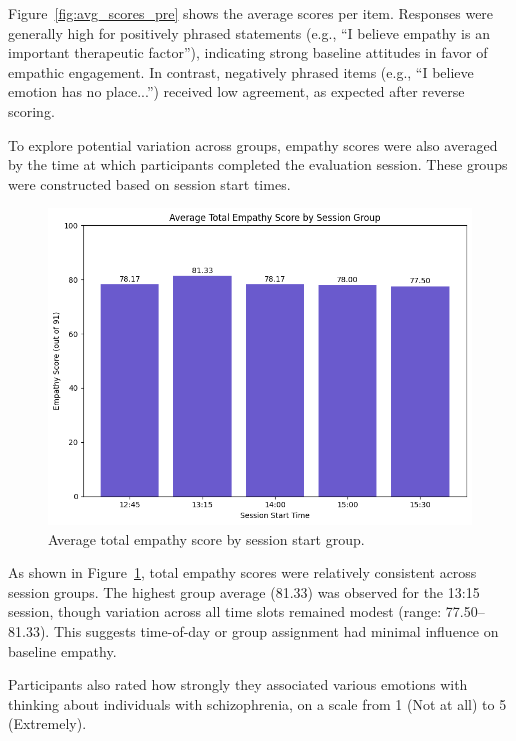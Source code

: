 Figure~\ref{fig:avg_scores_pre} shows the average scores per item. Responses were generally high for positively phrased statements (e.g., “I believe empathy is an important therapeutic factor”), indicating strong baseline attitudes in favor of empathic engagement. In contrast, negatively phrased items (e.g., “I believe emotion has no place...”) received low agreement, as expected after reverse scoring.

To explore potential variation across groups, empathy scores were also averaged by the time at which participants completed the evaluation session. These groups were constructed based on session start times.

\begin{figure}[H]
    \centering
    \includegraphics[width=0.75\columnwidth]{../../Figures/avg score-by-group-pre.png}
    \caption{Average total empathy score by session start group.}
    \label{fig:group_scores_pre}
\end{figure}

As shown in Figure~\ref{fig:group_scores_pre}, total empathy scores were relatively consistent across session groups. The highest group average (81.33) was observed for the 13:15 session, though variation across all time slots remained modest (range: 77.50–81.33). This suggests time-of-day or group assignment had minimal influence on baseline empathy.

Participants also rated how strongly they associated various emotions with thinking about individuals with schizophrenia, on a scale from 1 (Not at all) to 5 (Extremely).

